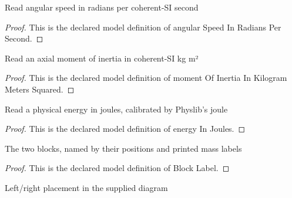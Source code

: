 \begin{definition}
  \label{def:physics:phyx-mini-0774:phyxminiproblems-problemphyxmini0774-angularspeedinradianspersecond}
  Read angular speed in radians per coherent-SI second
\end{definition}
\begin{proof}
  This is the declared model definition of angular Speed In Radians Per Second.
\end{proof}
\begin{definition}
  \label{def:physics:phyx-mini-0774:phyxminiproblems-problemphyxmini0774-momentofinertiainkilogrammeterssquared}
  Read an axial moment of inertia in coherent-SI kg m²
\end{definition}
\begin{proof}
  This is the declared model definition of moment Of Inertia In Kilogram Meters Squared.
\end{proof}
\begin{definition}
  \label{def:physics:phyx-mini-0774:phyxminiproblems-problemphyxmini0774-energyinjoules}
  Read a physical energy in joules, calibrated by Physlib's joule
\end{definition}
\begin{proof}
  This is the declared model definition of energy In Joules.
\end{proof}
\begin{definition}
  \label{def:physics:phyx-mini-0774:phyxminiproblems-problemphyxmini0774-blocklabel}
  The two blocks, named by their positions and printed mass labels
\end{definition}
\begin{proof}
  This is the declared model definition of Block Label.
\end{proof}
\begin{definition}
  \label{def:physics:phyx-mini-0774:phyxminiproblems-problemphyxmini0774-figureside}
  Left/right placement in the supplied diagram
\end{definition}
